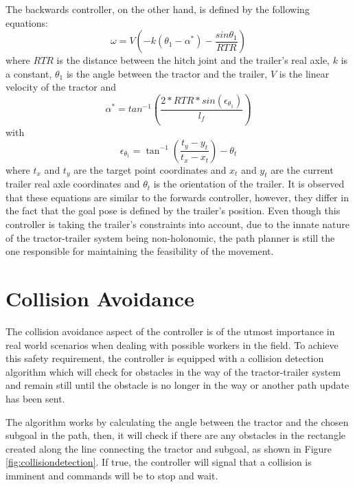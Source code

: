 The backwards controller, on the other hand, is defined by the following equations:
\begin{equation}
    \omega = V \left(-k (\theta_1 - \alpha^*) - \frac{sin\theta_1}{RTR}\right)
\end{equation}
where $RTR$ is the distance between the hitch joint and the trailer's real axle, 
$k$ is a constant, $\theta_1$ is the angle between the tractor and the trailer, 
$V$ is the linear velocity of the tractor and 
\begin{equation}
    \alpha^* = tan^{-1}\left(\frac{2*RTR*sin(\epsilon_{\theta_1})}{l_f}\right)
\end{equation}
with
\begin{equation}
    \epsilon_{\theta_1} = \tan^{-1}\left(\frac{t_y - y_t}{t_x - x_t}\right) - \theta_t
\end{equation}
where $t_x$ and $t_y$ are the target point coordinates and $x_t$ and $y_t$ are the current trailer real axle coordinates and 
$\theta_t$ is the orientation of the trailer. It is observed that 
these equations are similar to the forwards controller, however, they differ 
in the fact that the goal pose is defined by the trailer's position. Even though 
this controller is taking the trailer's constraints into account, due to 
the innate nature of the tractor-trailer system being non-holonomic, the 
path planner is still the one responsible for maintaining the feasibility 
of the movement.


\section{Collision Avoidance}
\label{sec:collision}
The collision avoidance aspect of the controller is of the utmost importance 
in real world scenarios when dealing with possible workers in the field. To achieve 
this safety requirement, the controller is equipped with a collision detection algorithm 
which will check for obstacles in the way of the tractor-trailer system and remain still until the 
obstacle is no longer in the way or another path update has been sent.

The algorithm works by calculating the angle between the tractor and the chosen 
subgoal in the path, then, it will check if there are any obstacles in the rectangle 
created along the line connecting the tractor and subgoal, as shown in Figure \ref{fig:collisiondetection}. If true, the controller will 
signal that a collision is imminent and commands will be to stop and wait.

